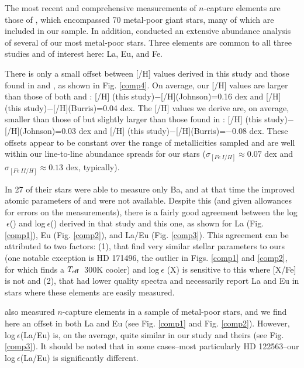 \documentclass[12pt,preprint]{aastex}
\def\teff{\mbox{$T_{\rm {eff}}$}}
\begin{document}
{The most recent and comprehensive measurements of $n$-capture elements are those of \citet{Burris2000}, which encompassed 70 metal-poor giant stars, many of which are included in our sample.  In addition, \citet{Johnson2002} conducted an extensive abundance analysis of several of our most metal-poor stars.  Three elements are common to all three studies and of interest here: La, Eu, and Fe.

There is only a small offset between [/H] values derived in this study and those found in \citet{Burris2000} and \citet{Johnson2002}, as shown in Fig. \ref{comp4}.  On average, our [/H] values are larger than those of both \citet{Johnson2002} and \citet{Burris2000}: [/H] (this study)$-$[/H](Johnson)=0.16 dex and [/H] (this study)$-$[/H](Burris)=0.04 dex.  The [/H] values we derive are, on average, smaller than those of \citet{Burris2000} but slightly larger than those found in \citet{Johnson2002}: [/H] (this study)$-$[/H](Johnson)=0.03 dex and [/H] (this study)$-$[/H](Burris)=$-0.08$ dex.  These offsets appear to be constant over the range of metallicities sampled and are well within our line-to-line abundance spreads for our stars ($\sigma_{[Fe~I/H]} \approx 0.07$ dex and $\sigma_{[Fe~II/H]} \approx 0.13$ dex, typically). 


In 27 of their stars \citet{Burris2000} were able to measure only Ba, and at that time the improved atomic parameters of \citet{LawlerLa} and \citet{LawlerEu} were not available.  Despite this (and given allowances for errors on the \citealt{Burris2000} measurements), there is a fairly good agreement between the log$~\epsilon$() and log$~\epsilon$()  derived in that study and this one, as shown for La (Fig. \ref{comp1}), Eu (Fig. \ref{comp2}), and La/Eu (Fig. \ref{comp3}).  This agreement can be attributed to two factors: (1), that \citet{Burris2000} find very similar stellar parameters to ours (one notable exception is HD 171496, the outlier in Figs. \ref{comp1} and \ref{comp2}, for which \citet{Burris2000} finds a \teff~300K cooler) and log$~\epsilon$ (X) is sensitive to this where [X/Fe] is not and (2), that \citet{Burris2000} had lower quality spectra and necessarily report La and Eu in stars where these elements are easily measured.

\citet{Johnson2002} also measured $n$-capture elements in a sample of metal-poor stars, and we find here an offset in both La and Eu (see Fig. \ref{comp1} and Fig. \ref{comp2}).  However, log$~\epsilon $(La/Eu) is, on the average, quite similar in our study and theirs (see Fig. \ref{comp3}).  It should be noted that in some cases--most particularly HD 122563--our log$~\epsilon$(La/Eu) is significantly different.  

}
\end{document}
